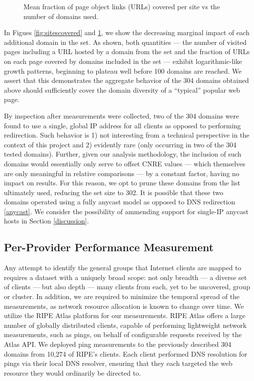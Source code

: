 \begin{figure}
    \caption{Mean fraction of page object links (URLs) covered per site vs the
    number of domains used.
    }
    \label{fig:linkscovered}
\end{figure}

In Figues \ref{fig:sitescovered} and \ref{fig:linkscovered}, we show the
decreasing marginal impact of each additional domain in the set. As shown, both
quantities --- the number of visited pages including a URL hosted by a domain
from the set and the fraction of URLs on each page covered by domains included
in the set --- exhibit logarithmic-like growth patterns, beginning to plateau
well before 100 domains are reached. We assert that this demonstrates the
aggregate behavior of the 304 domains obtained above should sufficiently cover
the domain diversity of a ``typical'' popular web page. 

By inspection after measurements were collected, two of
the 304 domains were found to use a single, global IP address for all clients as
opposed to performing redirection. Such behavior is 1) not interesting from a
technical perspective in the context of this project and 2) evidently rare (only
occurring in two of the 304 tested domains). Further, given our analysis
methodology, the inclusion of such domains would essentially only serve to
offset CNRE values --- which themselves are only meaningful in relative
comparisons --- by a constant factor, having no impact on results. For this
reason, we opt to prune these domains from the list ultimately used, reducing the
set size to 302. It is possible that these two domains operated using a fully
anycast model as opposed to DNS redirection \ref{anycast}. We consider the
possibility of ammending support for single-IP anycast hosts in Section
\ref{discussion}.


\subsection{Per-Provider Performance Measurement}

Any attempt to identify the general groups that Internet clients are mapped to
requires a dataset with a uniquely broad scope: not only breadth --- a diverse
set of clients --- but also depth --- many clients from each, yet to be
uncovered, group or cluster. In addition, we are required to minimize the
temporal spread of the measurements, as network resource allocation is known to
change over time. We utilize the RIPE Atlas platform \cite{ripe-atlas} for our measurements.
RIPE Atlas offers a large number of globally distributed clients, capable of
performing lightweight network measurements, such as pings, on behalf of
configurable requests received by the Atlas API. We deployed ping measurements
to the previously described 304 domains from 10,274 of RIPE's clients. Each
client performed DNS resolution for pings via their local DNS resolver, ensuring
that they each targeted the web resource they would ordinarily be directed to.

